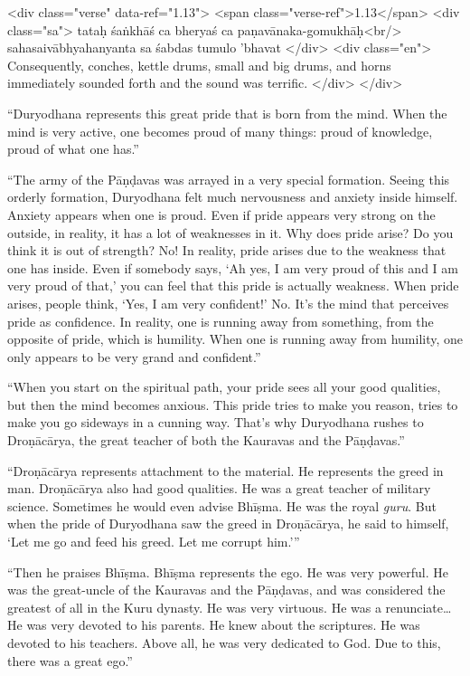 \begin{html}
<div class="verse" data-ref="1.13">
  <span class="verse-ref">1.13</span>
  <div class="sa">
    tataḥ śaṅkhāś ca bheryaś ca paṇavānaka-gomukhāḥ<br/>
    sahasaivābhyahanyanta sa śabdas tumulo ’bhavat
  </div>
  <div class="en">
    Consequently, conches, kettle drums, small and big drums, and horns immediately sounded forth and the sound was terrific.
  </div>
</div>
\end{html}



\enquote{Duryodhana represents this great pride that is born from the mind. When the mind is very active, one becomes proud of many things: proud of knowledge, proud of what one has.}

\enquote{The army of the Pāṇḍavas was arrayed in a very special formation. Seeing this orderly formation, Duryodhana felt much nervousness and anxiety inside himself. Anxiety appears when one is proud. Even if pride appears very strong on the outside, in reality, it has a lot of weaknesses in it. Why does pride arise? Do you think it is out of strength? No! In reality, pride arises due to the weakness that one has inside. Even if somebody says, \enquote{Ah yes, I am very proud of this and I am very proud of that,} you can feel that this pride is actually weakness. When pride arises, people think, \enquote{Yes, I am very confident!} No. It’s the mind that perceives pride as confidence. In reality, one is running away from something, from the opposite of pride, which is humility. When one is running away from humility, one only appears to be very grand and confident.}

\enquote{When you start on the spiritual path, your pride sees all your good qualities, but then the mind becomes anxious. This pride tries to make you reason, tries to make you go sideways in a cunning way. That’s why Duryodhana rushes to Droṇācārya, the great teacher of both the Kauravas and the Pāṇḍavas.}

\enquote{Droṇācārya represents attachment to the material. He represents the greed in man. Droṇācārya also had good qualities. He was a great teacher of military science. Sometimes he would even advise Bhīṣma. He was the royal \textit{guru}. But when the pride of Duryodhana saw the greed in Droṇācārya, he said to himself, \enquote{Let me go and feed his greed. Let me corrupt him.}}

\enquote{Then he praises Bhīṣma. Bhīṣma represents the ego. He was very powerful. He was the great-uncle of the Kauravas and the Pāṇḍavas, and was considered the greatest of all in the Kuru dynasty. He was very virtuous. He was a renunciate\ldots He was very devoted to his parents. He knew about the scriptures. He was devoted to his teachers. Above all, he was very dedicated to God. Due to this, there was a great ego.}

